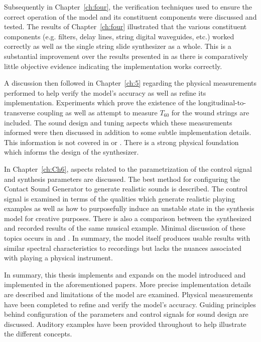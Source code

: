 \documentclass[../main.tex]{subfiles}
\begin{document}
Subsequently in Chapter~\ref{ch:four}, the verification techniques used to ensure the correct operation of the model and its constituent components were discussed and tested. The results of Chapter~\ref{ch:four} illustrated that the various constituent components (e.g. filters, delay lines, string digital waveguides, etc.) worked correctly as well as the single string slide synthesizer as a whole. This is a substantial improvement over the results presented in  as there is comparatively little objective evidence indicating the implementation works correctly.

A discussion then followed in Chapter~\ref{ch:5} regarding the physical measurements performed to help verify the model's accuracy as well as refine its implementation. Experiments which prove the existence of the longitudinal-to-transverse coupling as well as attempt to measure $T_{60}$ for the wound strings are included. The sound design and tuning aspects which these measurements informed were then discussed in addition to some subtle implementation details. This information is not covered in  or . There is a strong physical foundation which informs the design of the synthesizer.

In Chapter~\ref{ch:Ch6}, aspects related to the parametrization of the control signal and synthesis parameters are discussed. The best method for configuring the Contact Sound Generator to generate realistic sounds is described. The control signal is examined in terms of the qualities which generate realistic playing examples as well as how to purposefully induce an unstable state in the synthesis model for creative purposes. There is also a comparison between the synthesized and recorded results of the same musical example. Minimal discussion of these topics occurs in  and . In summary, the model itself produces usable results with similar spectral characteristics to recordings but lacks the nuances associated with playing a physical instrument.

In summary, this thesis implements and expands on the model introduced and implemented in the aforementioned papers. More precise implementation details are described and limitations of the model are examined. Physical measurements have been completed to refine and verify the model's accuracy. Guiding principles behind configuration of the parameters and control signals for sound design are discussed. Auditory examples have been provided throughout to help illustrate the different concepts.
\end{document}
